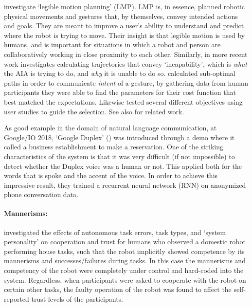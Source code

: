 \citet{Dragan2013-wd} investigate `legible motion planning' (LMP). LMP is, in essence, planned robotic physical movements and gestures that, by themselves, convey intended actions and goals. They are meant to improve a user's ability to understand and predict where the robot is trying to move. Their insight is that legible motion is used by humans, and is important for situations in which a robot and person are collaboratively working in close proximity to each other. Similarly, in more recent work \citet{Kwon2018-xt} investigates calculating trajectories that convey `incapability', which is \emph{what} the AIA is trying to do, and \emph{why} it is unable to do so. \cite{Dragan2013-wd} calculated sub-optimal paths in order to communicate \emph{intent} of a gesture, by gathering data from human participants they were able to find the parameters for their cost function that best matched the expectations. Likewise \cite{Kwon2018-xt} tested several different objectives using user studies to guide the selection. See also \cite{Admoni2016-db} for related work.

As good example in the domain of natural language communication, at Google/IO 2018, `Google Duplex' (\cite{Google2018-eb}) was introduced through a demo where it called a business establishment to make a reservation. One of the striking characteristics of the system is that it was very difficult (if not impossible) to detect whether the Duplex voice was a human or not. This applied both for the words that is spoke and the accent of the voice. In order to achieve this impressive result, they trained a recurrent neural network (RNN) on anonymized phone conversation data.



\paragraph{Mannerisms:}
\citet{Salem2015-md} investigated the effects of autonomous task errors, task types, and `system personality' on cooperation and trust for humans who observed a domestic robot performing house tasks, such that the robot implicitly showed competence by its mannerisms and successes/failures during tasks. In this case the mannerisms and competency of the robot were completely under control and hard-coded into the system. Regardless, when participants were asked to cooperate with the robot on certain other tasks, the faulty operation of the robot was found to affect the self-reported trust levels of the participants.


